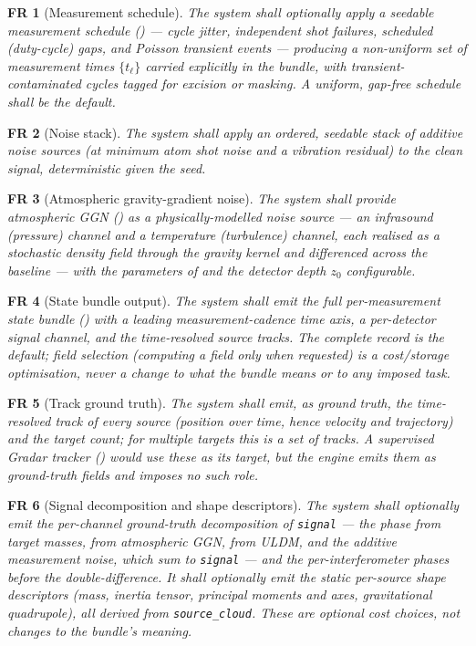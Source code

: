 \documentclass[11pt,a4paper]{article}
\theoremstyle{reqstyle}
\newtheorem{freq}{FR}
\begin{document}
\begin{freq}[Measurement schedule]
The system shall optionally apply a seedable measurement schedule () ---
cycle jitter, independent shot failures, scheduled (duty-cycle) gaps, and Poisson transient
events --- producing a non-uniform set of measurement times $\{t_\ell\}$ carried explicitly in
the bundle, with transient-contaminated cycles tagged for excision or masking. A uniform,
gap-free schedule shall be the default.
\end{freq}

\begin{freq}[Noise stack]
The system shall apply an ordered, seedable stack of additive noise sources (at minimum
atom shot noise and a vibration residual) to the clean signal, deterministic given the seed.
\end{freq}

\begin{freq}[Atmospheric gravity-gradient noise]
The system shall provide atmospheric GGN () as a physically-modelled noise
source --- an infrasound (pressure) channel and a temperature (turbulence) channel, each
realised as a stochastic density field through the gravity kernel and differenced across the
baseline --- with the parameters of  and the detector depth $z_0$ configurable.
\end{freq}

\begin{freq}[State bundle output]
The system shall emit the full per-measurement state bundle () with a leading
measurement-cadence time axis, a per-detector signal channel, and the time-resolved source
tracks. The \emph{complete} record is the default; \emph{field selection} (computing a field only
when requested) is a cost/storage optimisation, never a change to what the bundle means or to any
imposed task.
\end{freq}

\begin{freq}[Track ground truth]
The system shall emit, as ground truth, the time-resolved track of every source (position over
time, hence velocity and trajectory) and the target count; for multiple targets this is a set of
tracks. A supervised Gradar tracker () would use these as its target, but the
engine emits them as ground-truth fields and imposes no such role.
\end{freq}

\begin{freq}[Signal decomposition and shape descriptors]
The system shall optionally emit the per-channel ground-truth decomposition of \texttt{signal} ---
the phase from target masses, from atmospheric GGN, from ULDM, and the additive measurement noise,
which sum to \texttt{signal} --- and the per-interferometer phases before the double-difference.
It shall optionally emit the static per-source shape descriptors (mass, inertia tensor, principal
moments and axes, gravitational quadrupole), all derived from \texttt{source\_cloud}. These are
\emph{optional} cost choices, not changes to the bundle's meaning.
\end{freq}
\end{document}
